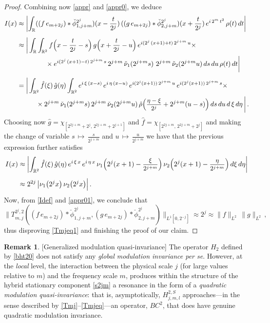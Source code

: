 \documentclass[a4paper,reqno]{amsart}
\numberwithin{equation}{section}
\theoremstyle{definition}
\newtheorem{remark}[theorem]{Remark}
\newcommand{\R}{\mathbb{R}}
\newcommand{\sdfrac}[2]{\mbox{\small$\displaystyle\frac{#1}{#2}$}}
\begin{document}
\begin{proof}
Combining now  \eqref{appr} and \eqref{appr0}, we deduce
\begin{align*}
	I(x)&\approx\left|\int_{\R}  ((f\,e_{m+2j})*\check{\phi}_{1,j+m}^{2^j})(x-\frac{t}{2^j})\,
	((g\,e_{m+2j})*\check{\phi}_{2,j+m}^{2^j})(x+\frac{t}{2^j})\,e^{i\,2^m\,t^2}\,\rho(t)\,dt\right|\\[1ex]
	&\approx \bigg|\int_{\R} \int_{\R^2} f\Big(x-\frac{t}{2^j}-s\Big)\,g\Big(x+\frac{t}{2^j}-u\Big)\,e^{i (2^j\,(x+1)+t)\, 2^{j+m}\,u}\times\\
	&\hspace{1.5cm}\times  e^{i (2^j\,(x+1)-t)\, 2^{j+m}\,s }\,2^{j+m}\,
	\check{\nu}_{1}(2^{j+m} s)\,\,2^{j+m}\,
	\check{\nu}_{2}(2^{j+m} u)\,ds\,du\,\rho(t)\,dt\bigg|\\[1ex]
	&=\bigg|\int_{\R^2} \hat{f}(\xi)\,\hat{g}(\eta)\int_{\R^2} e^{i\,\xi\,(x-s)}\,e^{i\,\eta\,(x-u)}\,e^{i (2^j(x+1))\, 2^{j+m}\,u}\,e^{i(2^j(x+1))\, 2^{j+m}\,s }\times\\
	&\hspace{1cm}\times 2^{j+m}\,\check{\nu}_{1}(2^{j+m} s)\,2^{j+m}\,\check{\nu}_{2}(2^{j+m} u)\, \hat{\rho}\Big(\sdfrac{\eta-\xi}{2^j}+2^{j+m}(u-s)\Big)\,ds\,du\,d\,\xi\,d\eta\,\bigg|\,.
\end{align*}
Choosing now $\hat{g}=\chi_{[2^{2j+m}+2^{j},\,2^{2j+m}+2^{j+1}]}$ and $\hat{f}=\chi_{[2^{2j+m},\,2^{2j+m}+2^{j}]}$ and making the change of variable $s\,\mapsto\,\frac{s}{2^{j+m}}$ and $u\,\mapsto\,\frac{u}{2^{j+m}}$ we have that the previous expression further satisfies
\begin{align}
	I(x)&\approx\left|\int_{\R^2} \hat{f}(\xi)\,\hat{g}(\eta)\,e^{i\,\xi\,x}\,e^{i\,\eta\,x}\,\nu_1\Big(2^j(x+1)-\sdfrac{\xi}{2^{j+m}}\Big)\,
	\nu_2\Big(2^j(x+1)-\sdfrac{\eta}{2^{j+m}}\Big)\,d\xi\,d\eta\right|\nonumber\\[1ex]
	&\approx  2^{2j}\,\big|\nu_1\big(2^j x\big)\, \nu_2\big(2^j x\big)\Big|\,.	\label{appr01}
\end{align}
Now, from \eqref{Idef} and \eqref{appr01}, we conclude that
$$\|T_{m,j}^{2^j,2}((f\,e_{m+2j})*\check{\phi}_{1,j+m}^{2^j},(g\,e_{m+2j})*\check{\phi}_{2,j+m}^{2^j})\|_{L^1[0,2^{-j}]}\approx 2^{j}\approx\|f\|_{L^2}\,\|g\|_{L^2}\,,$$
thus disproving \eqref{Tmjeq1} and finishing the proof of our claim.
\end{proof}

\begin{remark}\label{Quasi}[\textsf{Generalized modulation quasi-invariance}]  The operator $H_2$ defined by \eqref{bht20} does not satisfy any \emph{global modulation invariance per se}. However, at the \emph{local} level, the interaction between the physical scale $j$ (for large values relative to $m$) and the frequency scale $m$, produces within the structure of the hybrid stationary component \eqref{s2jm} a resonance in the form of a \emph{quadratic modulation quasi-invariance}: that is, asymptotically, $H^{2,S}_{j,m,l}$ approaches---in the sense described by \eqref{Tmj}--\eqref{Tmjeq}---an operator, $BC^{2}$, that does have genuine quadratic modulation invariance.
\end{remark}
\end{document}
